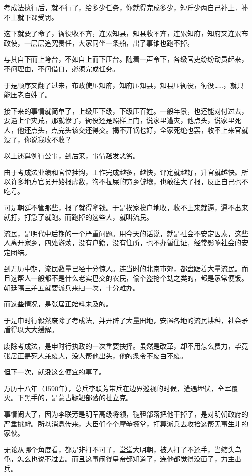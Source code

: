 \begin{multicols}{\theparacolNo}
考成法执行后，就不行了，给多少任务，你就得完成多少，短斤少两自己补上，补不上就下课受罚。

这下就要了命了，衙役收不齐，连累知县，知县收不齐，连累知府，知府又连累布政使，一层层追究责任，大家同坐一条船，出了事谁也跑不掉。

与其自下而上垮台，不如自上而下压台。随着一声令下，各级官吏纷纷动员起来，不问理由，不问借口，必须完成任务。

于是顺序又翻了过来，布政使压知府，知府压知县，知县压衙役，衙役……，就只能压老百姓了。

接下来的事情就简单了，上级压下级，下级压百姓。一般年景，也还能对付过去，要遇上个灾荒，那就惨了，衙役还是照样上门，说家里遭灾，他点头，说家里死人，他还点头，点完头该交还得交。揭不开锅也好，全家死绝也罢，收不上来官就没了，你说我收不收？

以上还算例行公事，到后来，事情越发恶劣。

由于考成法业绩和官位挂钩，工作完成越多，越快，评定就越好，升官就越快。所以许多地方官员开始报虚数，狗不拉屎的穷乡僻壤，也敢往大了报，反正自己也不吃亏。

可是朝廷不管那些，报了就得拿钱。于是挨家挨户地收，收不上来就逼，逼不出来就打，打急了就跑。而跑掉的这些人，就叫流民。

流民，是明代中后期的一个严重问题。用今天的话说，就是社会不安定因素，这些人离开家乡，四处游荡，没有户籍，没有住所，也不办暂住证，经常影响社会的安定团结。

到万历中期，流民数量已经十分惊人。连当时的北京市郊，都盘踞着大量流民。而且这帮人一般都不是什么老实巴交的农民，偷个盗抢个劫之类的，都是家常便饭。朝廷隔三差五就要派兵来扫一次，十分难办。

而这些情况，是张居正始料未及的。

于是申时行毅然废除了考成法，并开辟了大量田地，安置各地的流民耕种，社会矛盾得以大大缓解。

废除考成法，是申时行执政的一次重要抉择。虽然是改革，却不用怎么费力，毕竟张居正是死人兼废人，没人帮他出头，他的条令不废白不废。

但下一次，就没这么便宜的事了。

万历十八年（1590年），总兵李联芳带兵在边界巡视的时候，遭遇埋伏，全军覆灭。下黑手的，是蒙古鞑靼部落的扯立克。

事情闹大了，因为李联芳是明军高级将领，鞑靼部落把他干掉了，是对明朝政府的严重挑衅。所以消息传来，大臣们个个摩拳擦掌，打算派兵去收拾这帮无事生非的家伙。

无论从哪个角度看，都是非打不可了，堂堂大明朝，被人打了不还手，当缩头乌龟，怎么也说不过去。而且这事闹得皇帝都知道了，连他都觉得没面子，力主出兵。


\end{multicols}
